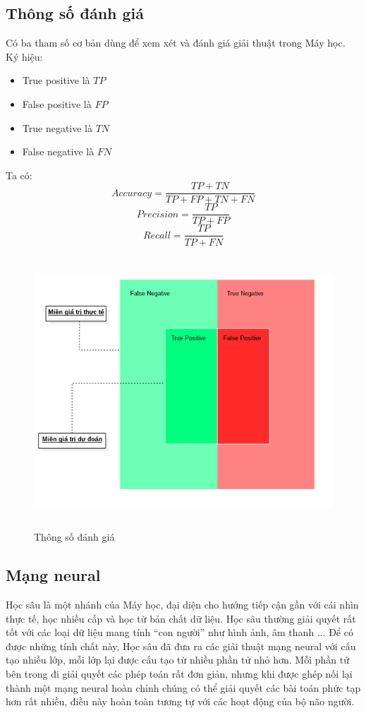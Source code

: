 \subsection{Thông số đánh giá}
Có ba tham số cơ bản dùng để xem xét và đánh giá giải thuật trong Máy học.
Ký hiệu:
\begin{itemize}
\item True positive là $TP$
\item False positive là $FP$
\item True negative là $TN$
\item False negative là $FN$
\end{itemize}
Ta có:\\
\[
  Accuracy = \frac{TP+TN}{TP+FP+TN+FN}
\]
\[
  Precision = \frac{TP}{TP+FP}
\]
\[
  Recall = \frac{TP}{TP+FN}
\]
\begin{figure}[h!]
\centering
\includegraphics[height=4in, keepaspectratio=true]{precision_recall.png}
\caption{Thông số đánh giá}
\end{figure}
\subsection{Mạng neural}
Học sâu là một nhánh của Máy học, đại diện cho hướng tiếp cận gần với cái nhìn 
thực tế, học nhiều cấp và học từ bản chất dữ liệu. Học sâu thường giải quyết 
rất tốt với các loại dữ liệu mang tính ``con người'' như hình ảnh, âm thanh ... 
Để có được những tính chất này, Học sâu đã đưa ra các giải thuật mạng neural 
với cấu tạo nhiều lớp, mỗi lớp lại được cấu tạo từ nhiều phần tử nhỏ hơn. Mỗi 
phần tử bên trong đi giải quyết các phép toán rất đơn giản, nhưng khi được ghép 
nối lại thành một mạng neural hoàn chỉnh chúng có thể giải quyết các bài toán 
phức tạp hơn rất nhiều, điều này hoàn toàn tương tự với các hoạt động của bộ 
não người. \cite{NeuralNetworksandDeepLearning} 
